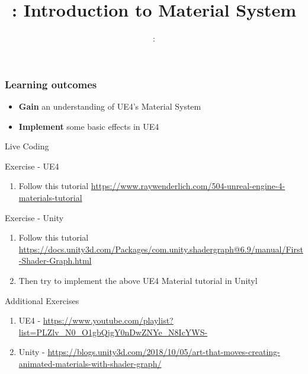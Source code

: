 \usepackage{../../beamerthemeFalmouthGamesAcademy}
\usepackage{multimedia}
\graphicspath{ {../../} }


\usepackage[normalem]{ulem}
\usepackage{wasysym}

\usepackage{pdfpages}

\usetikzlibrary{arrows,automata}




\title{\sessionnumber: Introduction to Material System}
\subtitle{\modulecode: \moduletitle}

\frame{\titlepage} 

\begin{frame}
	\frametitle{Learning outcomes}
	\begin{itemize}
		\item \textbf{Gain} an understanding of UE4's Material System
		\item \textbf{Implement} some basic effects in UE4
	\end{itemize}
\end{frame}

\begin{frame}
	\begin{center}
		Live Coding
	\end{center}
\end{frame}


\begin{frame}{Exercise - UE4}
\begin{enumerate}
	\item Follow this tutorial \url{https://www.raywenderlich.com/504-unreal-engine-4-materials-tutorial} 
\end{enumerate}
\end{frame}

\begin{frame}{Exercise - Unity}
	\begin{enumerate}
		\item Follow this tutorial \url{https://docs.unity3d.com/Packages/com.unity.shadergraph@6.9/manual/First-Shader-Graph.html} 
		\item Then try to implement the above UE4 Material tutorial in Unityl
	\end{enumerate}
\end{frame}

\begin{frame}{Additional Exercises}
	\begin{enumerate}
		\item UE4 - \url{https://www.youtube.com/playlist?list=PLZlv_N0_O1gbQjgY0nDwZNYe_N8IcYWS-}
		\item Unity - \url{https://blogs.unity3d.com/2018/10/05/art-that-moves-creating-animated-materials-with-shader-graph/}
	\end{enumerate}
\end{frame}



